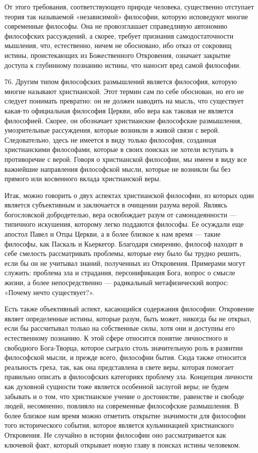 \documentclass[a5paper,10pt]{article}
\begin{document}
От этого требования, соответствующего природе человека, существенно отступает
теория так называемой «независимой» философии, которую исповедуют многие
современные философы. Она не провозглашает справедливую автономию философских
рассуждений, а скорее, требует признания самодостаточности мышления, что,
естественно, ничем не обосновано, ибо отказ от сокровищ истины, проистекающих
из Божественного Откровения, означает закрытие доступа к глубинному познанию
истины, что наносит вред самой философии.

76. Другим типом философских размышлений является философия, которую многие
называют христианской. Этот термин сам по себе обоснован, но его не следует
понимать превратно: он не должен наводить на мысль, что существует какая-то
официальная философия Церкви, ибо вера как таковая не является философией.
Скорее, он обозначает христианские философские размышления, умозрительные
рассуждения, которые возникли в живой связи с верой.  Следовательно, здесь не
имеется в виду только философия, созданная христианскими философами, которые в
своих поисках не хотели вступать в противоречие с верой. Говоря о христианской
философии, мы имеем в виду все важнейшие направления философской мысли, которые
не возникли бы без прямого или косвенного вклада христианской веры.

Итак, можно говорить о двух аспектах христианской философии, из которых один
является субъективным и заключается в очищении разума верой. Являясь
богословской добродетелью, вера освобождает разум от самонадеянности —
типичного искушения, которому легко поддаются философы. Ее осуждали еще апостол
Павел и Отцы Церкви, а в более близкое к нам время — такие философы, как
Паскаль и Кьеркегор. Благодаря смирению, философ находит в себе смелость
рассматривать проблемы, которые ему было бы трудно решить, если бы он не
учитывал знаний, полученных из Откровения. Примерами могут служить: проблема
зла и страдания, персонификация Бога, вопрос о смысле жизни, а более
непосредственно — радикальный метафизический вопрос: «Почему нечто
существует?».

Есть также объективный аспект, касающийся содержания философии: Откровение
являет определенные истины, которые разум, быть может, никогда бы не открыл,
если бы рассчитывал только на собственные силы, хотя они и доступны его
естественному познанию. К этой сфере относится понятие личностного и свободного
Бога-Творца, которое сыграло столь значительную роль в развитии философской
мысли, и прежде всего, философии бытия. Сюда также относится реальность греха,
так, как она представлена в свете веры, которая помогает правильно описать в
философских категориях проблему зла. Концепция личности как духовной сущности
тоже является особенной заслугой веры; не будем забывать и о том, что
христианское учение о достоинстве, равенстве и свободе людей, несомненно,
повлияло на современные философские размышления. В более близкое нам время
можно отметить открытие значимости для философии того исторического события,
которое является кульминацией христианского Откровения.  Не случайно в истории
философии оно рассматривается как ключевой факт, который открывает новую главу
в поисках истины человеком.
\end{document}
